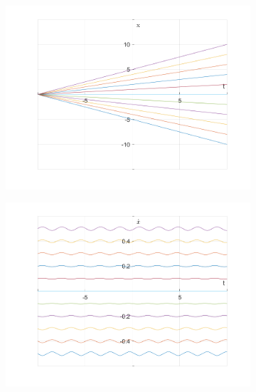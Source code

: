 \documentclass{article}
\begin{document}
	\begin{figure}[h!]
		\centering
		\begin{subfigure}[b]{0.48\linewidth}
			\includegraphics[width=\linewidth]{./SmallOscillations/S8/F3.png}
		\end{subfigure}
		\begin{subfigure}[b]{0.48\linewidth}
			\includegraphics[width=\linewidth]{./SmallOscillations/S8/F4.png}
		\end{subfigure}
	\end{figure}
\end{document}
